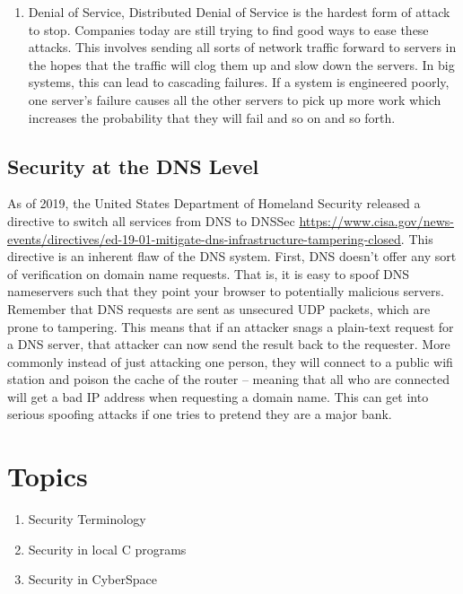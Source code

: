 \begin{enumerate}
  The SYN flood is easily mitigated by using IPTABLES or another netfilter module to drop all incoming connections from an IP address after a certain volume of traffic is reached for a certain period.
\item Denial of Service, Distributed Denial of Service is the hardest form of attack to stop.
  Companies today are still trying to find good ways to ease these attacks.
  This involves sending all sorts of network traffic forward to servers in the hopes that the traffic will clog them up and slow down the servers.
  In big systems, this can lead to cascading failures. If a system is engineered poorly, one server's failure causes all the other servers to pick up more work which increases the probability that they will fail and so on and so forth.
\end{enumerate}

\subsection{Security at the DNS Level}

As of 2019, the United States Department of Homeland Security released a directive to switch all services from DNS to DNSSec \url{https://www.cisa.gov/news-events/directives/ed-19-01-mitigate-dns-infrastructure-tampering-closed}.
This directive is an inherent flaw of the DNS system.
First, DNS doesn't offer any sort of verification on domain name requests.
That is, it is easy to spoof DNS nameservers such that they point your browser to potentially malicious servers.
Remember that DNS requests are sent as unsecured UDP packets, which are prone to tampering. This means that if an attacker snags a plain-text request for a DNS server, that attacker can now send the result back to the requester.
More commonly instead of just attacking one person, they will connect to a public wifi station and poison the cache of the router -- meaning that all who are connected will get a bad IP address when requesting a domain name.
This can get into serious spoofing attacks if one tries to pretend they are a major bank.

\section{Topics}

\begin{enumerate}
\item Security Terminology
\item Security in local C programs
\item Security in CyberSpace
\end{enumerate}

